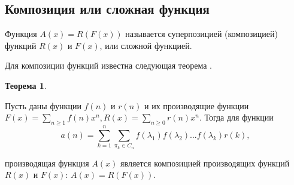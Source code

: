 \documentclass[
russian,
cp1251,
14pt,
simple
]{eskdtext}
\theoremstyle{definition}
\newtheorem{theorem}{\normalfont Теорема}[subsection]
\begin{document}
\subsection{Композиция или сложная функция}

Функция $A(x)=R\left(F\left(x\right)\right)$ называется суперпозицией (композицией) функций $R(x)$ и $F(x)$, или сложной функцией.

Для композиции функций известна следующая теорема \cite{KruchininVV}.

\begin{theorem}
\end{theorem}
Пусть даны функции $f(n)$ и $r(n)$ и их производящие функции $F(x)=\sum\limits _{n\ge 1}f(n)x^{n} ,R(x)=\sum\limits _{n\ge 0}r(n)x^{n}   $. Тогда для функции
$$
a(n)=\sum\limits _{k=1}^{n}\sum\limits _{\pi _{k} \in C_{n} }f(\lambda _{1} )f(\lambda _{2} ) ...f(\lambda _{k} )r(k) ,  
$$

производящая функция $A(x)$ является композицией производящих функций $R(x)$ и $F(x)$: $A(x)=R(F(x))$.
\end{document}
